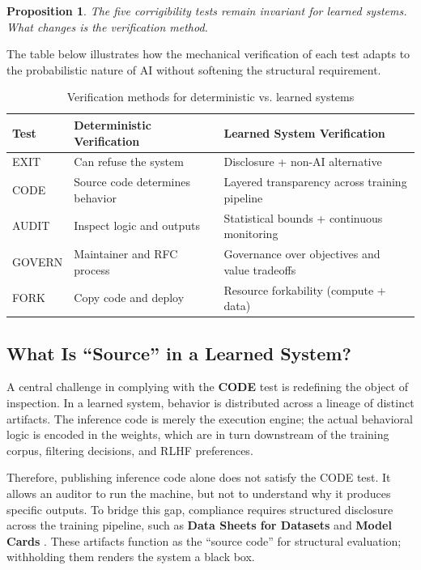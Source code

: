 \documentclass{article}
\newtheorem{proposition}{Proposition}
\begin{document}
\begin{proposition}
The five corrigibility tests remain invariant for learned systems. What changes is the verification method.
\end{proposition}

The table below illustrates how the mechanical verification of each test adapts to the probabilistic nature of AI without softening the structural requirement.

\begin{table}[htbp]
\centering
\begin{tabular}{@{}lll@{}}
\toprule
\textbf{Test} & \textbf{Deterministic Verification} & \textbf{Learned System Verification} \\
\midrule
EXIT & Can refuse the system & Disclosure + non-AI alternative \\
CODE & Source code determines behavior & Layered transparency across training pipeline \\
AUDIT & Inspect logic and outputs & Statistical bounds + continuous monitoring \\
GOVERN & Maintainer and RFC process & Governance over objectives and value tradeoffs \\
FORK & Copy code and deploy & Resource forkability (compute + data) \\
\bottomrule
\end{tabular}
\caption{Verification methods for deterministic vs. learned systems}
\end{table}

\subsection{What Is ``Source'' in a Learned System?}

A central challenge in complying with the \textbf{CODE} test is redefining the object of inspection. In a learned system, behavior is distributed across a lineage of distinct artifacts. The inference code is merely the execution engine; the actual behavioral logic is encoded in the weights, which are in turn downstream of the training corpus, filtering decisions, and RLHF preferences.

Therefore, publishing inference code alone does not satisfy the CODE test. It allows an auditor to run the machine, but not to understand why it produces specific outputs. To bridge this gap, compliance requires structured disclosure across the training pipeline, such as \textbf{Data Sheets for Datasets} \citep{gebru2021} and \textbf{Model Cards} \citep{mitchell2019}. These artifacts function as the ``source code'' for structural evaluation; withholding them renders the system a black box.
\end{document}
